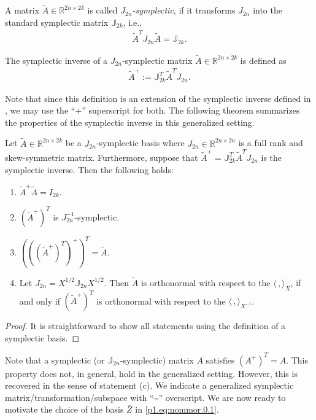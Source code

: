\begin{definition}
A matrix $\tilde A\in \mathbb R^{2n\times 2k}$ is called \emph{$J_{2n}$-symplectic}, if it transforms $J_{2n}$ into the standard symplectic matrix $\mathbb J_{2k}$, i.e.,
\begin{eqnarray} \label{p1.eq:nommor.0.3}
	\tilde A^T J_{2n} \tilde A = \mathbb J_{2k}.
\end{eqnarray}
\end{definition}

\begin{definition}
The symplectic inverse of a $J_{2n}$-symplectic matrix $\tilde A\in \mathbb R^{2n\times 2k}$ is defined as
\begin{eqnarray} \label{p1.eq:nommor.0.4}
	\tilde A^{+} := \mathbb J_{2k}^T \tilde A^T J_{2n}.
\end{eqnarray}
\end{definition}
Note that since this definition is an extension of the symplectic inverse defined in \cite{doi:10.1137/140978922}, we may use the ``$+$'' superscript for both. The following theorem summarizes the properties of the symplectic inverse in this generalized setting.

\begin{proposition} \label{thm:4.1}
Let $\tilde A\in \mathbb R^{2n\times 2k}$ be a $J_{2n}$-symplectic basis where $J_{2n}\in\mathbb R^{2n\times 2n}$ is a full rank and skew-symmetric matrix. Furthermore, suppose that $\tilde A^{+} = \mathbb{J}_{2k}^T \tilde A^T J_{2n}$ is the symplectic inverse. Then the following holds:
\begin{enumerate}[$\qquad$(a)]
\item $\tilde A^+ \tilde A = I_{2k}$.
\item $(\tilde A^+)^T$ is $J_{2n}^{-1}$-symplectic.
\item $\left(\left(\left(\tilde A^+\right)^T\right)^+\right)^T = \tilde A$.
\item Let $J_{2n}=X^{1/2}\mathbb J_{2n} X^{1/2}$. Then $\tilde A$ is orthonormal with respect to the $\langle\,,\rangle_X$, if and only if $(\tilde A^+)^T$ is orthonormal with respect to the $\langle\,,\rangle_{X^{-1}}$.
\end{enumerate}
\end{proposition}
\begin{proof}
It is straightforward to show all statements using the definition of a symplectic basis.
\end{proof}

Note that a symplectic (or $\mathbb J_{2n}$-symplectic) matrix $A$ satisfies $(A^+)^T = A$. This property does not, in general, hold in the generalized setting. However, this is recovered in the sense of statement (c). We indicate a generalized symplectic matrix/transformation/subspace with ``\textasciitilde'' overscript. We are now ready to motivate the choice of the basis $\bar Z$ in \eqref{p1.eq:nommor.0.1}.

